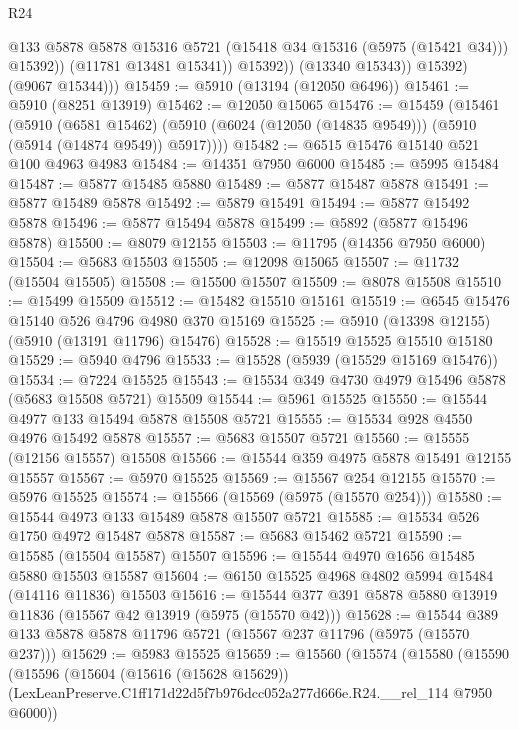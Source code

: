 \begin{lexlean}{R24}
\begin{coremodule}
                      @133
                      @5878
                      @5878
                      @15316
                      @5721
                      (@15418 @34 @15316 (@5975 (@15421 @34)))
                      @15392))
                  (@11781 @13481 @15341))
                @15392))
            (@13340 @15343))
          @15392)
        (@9067 @15344)))
@15459 := @5910 (@13194 (@12050 @6496))
@15461 := @5910 (@8251 @13919)
@15462 := @12050 @15065
@15476 := @15459
    (@15461
      (@5910
        (@6581 @15462)
        (@5910 (@6024 (@12050 (@14835 @9549))) (@5910 (@5914 (@14874 @9549)) @5917))))
@15482 := @6515 @15476 @15140 @521 @100 @4963 @4983
@15484 := @14351 @7950 @6000
@15485 := @5995 @15484
@15487 := @5877 @15485 @5880
@15489 := @5877 @15487 @5878
@15491 := @5877 @15489 @5878
@15492 := @5879 @15491
@15494 := @5877 @15492 @5878
@15496 := @5877 @15494 @5878
@15499 := @5892 (@5877 @15496 @5878)
@15500 := @8079 @12155
@15503 := @11795 (@14356 @7950 @6000)
@15504 := @5683 @15503
@15505 := @12098 @15065
@15507 := @11732 (@15504 @15505)
@15508 := @15500 @15507
@15509 := @8078 @15508
@15510 := @15499 @15509
@15512 := @15482 @15510 @15161
@15519 := @6545 @15476 @15140 @526 @4796 @4980 @370 @15169
@15525 := @5910 (@13398 @12155) (@5910 (@13191 @11796) @15476)
@15528 := @15519 @15525 @15510 @15180
@15529 := @5940 @4796
@15533 := @15528 (@5939 (@15529 @15169 @15476))
@15534 := @7224 @15525
@15543 := @15534 @349 @4730 @4979 @15496 @5878 (@5683 @15508 @5721) @15509
@15544 := @5961 @15525
@15550 := @15544 @4977 @133 @15494 @5878 @15508 @5721
@15555 := @15534 @928 @4550 @4976 @15492 @5878
@15557 := @5683 @15507 @5721
@15560 := @15555 (@12156 @15557) @15508
@15566 := @15544 @359 @4975 @5878 @15491 @12155 @15557
@15567 := @5970 @15525
@15569 := @15567 @254 @12155
@15570 := @5976 @15525
@15574 := @15566 (@15569 (@5975 (@15570 @254)))
@15580 := @15544 @4973 @133 @15489 @5878 @15507 @5721
@15585 := @15534 @526 @1750 @4972 @15487 @5878
@15587 := @5683 @15462 @5721
@15590 := @15585 (@15504 @15587) @15507
@15596 := @15544 @4970 @1656 @15485 @5880 @15503 @15587
@15604 := @6150 @15525 @4968 @4802 @5994 @15484 (@14116 @11836) @15503
@15616 := @15544 @377 @391 @5878 @5880 @13919 @11836 (@15567 @42 @13919 (@5975 (@15570 @42)))
@15628 := @15544 @389 @133 @5878 @5878 @11796 @5721 (@15567 @237 @11796 (@5975 (@15570 @237)))
@15629 := @5983 @15525
@15659 := @15560
    (@15574
      (@15580
        (@15590
          (@15596
            (@15604
              (@15616 (@15628 @15629))
              (LexLeanPreserve.C1ff171d22d5f7b976dcc052a277d666e.R24.__rel_114 @7950 @6000))

\end{coremodule}
\end{lexlean}
